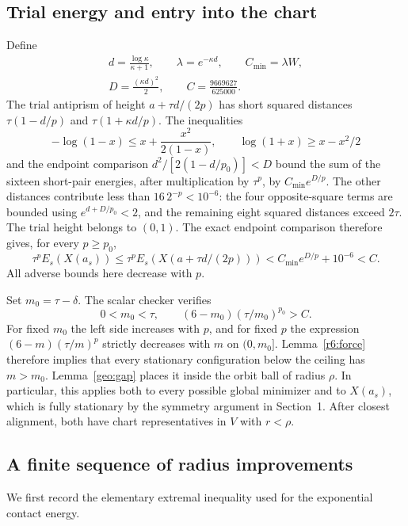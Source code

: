\documentclass[12pt,reqno]{amsart}
\theoremstyle{definition}
\numberwithin{equation}{section}
\begin{document}
\subsection{Trial energy and entry into the chart}
Define
\[
\begin{gathered}
 d=\frac{\log\kappa}{\kappa+1},\qquad \lambda=e^{-\kappa d},\qquad
 C_{\min}=\lambda W,\\ D=\frac{(\kappa d)^2}{2},\qquad
 C=\frac{9669627}{625000}.
\end{gathered}
\]
The trial antiprism of height $a+\tau d/(2p)$ has short squared
distances $\tau(1-d/p)$ and $\tau(1+\kappa d/p)$. The inequalities
\[
 -\log(1-x)\le x+\frac{x^2}{2(1-x)},\qquad
 \log(1+x)\ge x-x^2/2
\]
and the endpoint comparison $d^2/[2(1-d/p_0)]<D$ bound the sum of
the sixteen short-pair energies, after multiplication by $\tau^p$,
by $C_{\min}e^{D/p}$.
The other distances contribute less than $16\,2^{-p}<10^{-6}$:
the four opposite-square terms are bounded using
$e^{d+D/p_0}<2$, and the remaining eight squared distances exceed
$2\tau$. The trial height belongs to $(0,1)$.
The exact endpoint comparison therefore gives, for every $p\ge p_0$,
\begin{equation}\label{tail:ceiling}
 \tau^p E_s(X(a_s))\le
 \tau^p E_s(X(a+\tau d/(2p)))
 <C_{\min}e^{D/p}+10^{-6}<C.
\end{equation}
All adverse bounds here decrease with $p$.

Set $m_0=\tau-\delta$. The scalar checker verifies
\[
 0<m_0<\tau,\qquad (6-m_0)(\tau/m_0)^{p_0}>C.
\]
For fixed $m_0$ the left side increases with $p$, and for fixed $p$
the expression $(6-m)(\tau/m)^p$ strictly decreases with $m$ on
$(0,m_0]$. Lemma~\ref{r6:force} therefore implies that every
stationary configuration below the ceiling has $m>m_0$.
Lemma~\ref{geo:gap} places it inside the orbit ball of radius $\rho$.
In particular, this applies both to every possible global minimizer
and to $X(a_s)$, which is fully stationary by the symmetry argument
in Section~1. After closest alignment, both have chart representatives
in $V$ with $r<\rho$.

\subsection{A finite sequence of radius improvements}
We first record the elementary extremal inequality used for the
exponential contact energy.
\end{document}
